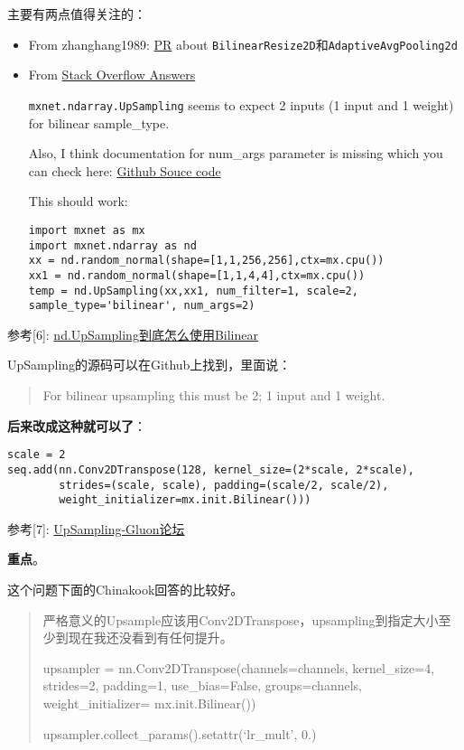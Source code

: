 主要有两点值得关注的：
\begin{itemize}
\item From zhanghang1989: \href{https://github.com/apache/incubator-mxnet/pull/9688}{PR} about \verb|BilinearResize2D|和\verb|AdaptiveAvgPooling2d|
\item From \href{https://stackoverflow.com/questions/47897924/implementing-bilinear-interpolation-with-mxnet-ndarray-upsampling}{Stack Overflow Answers}

\verb|mxnet.ndarray.UpSampling| seems to expect 2 inputs (1 input and 1 weight) for bilinear sample\_type.

Also, I think documentation for num\_args parameter is missing which you can check here: \href{https://github.com/apache/incubator-mxnet/blob/master/src/operator/nn/upsampling-inl.h#L78}{Github Souce code}

This should work:

\begin{lstlisting}
import mxnet as mx
import mxnet.ndarray as nd
xx = nd.random_normal(shape=[1,1,256,256],ctx=mx.cpu())
xx1 = nd.random_normal(shape=[1,1,4,4],ctx=mx.cpu()) 
temp = nd.UpSampling(xx,xx1, num_filter=1, scale=2, sample_type='bilinear', num_args=2)
\end{lstlisting}

\end{itemize}

参考[6]: \href{https://discuss.gluon.ai/t/topic/2823}{nd.UpSampling到底怎么使用Bilinear}

UpSampling的源码可以在Github上找到，里面说：

\begin{quote}
For bilinear upsampling this must be 2; 1 input and 1 weight.
\end{quote}
\textbf{后来改成这种就可以了}：
\begin{lstlisting}
scale = 2
seq.add(nn.Conv2DTranspose(128, kernel_size=(2*scale, 2*scale), 
		strides=(scale, scale), padding=(scale/2, scale/2), 
		weight_initializer=mx.init.Bilinear()))
\end{lstlisting}

参考[7]: \href{https://discuss.gluon.ai/t/topic/2672}{UpSampling-Gluon论坛}

\textbf{重点}。

这个问题下面的Chinakook回答的比较好。

\begin{quote}
严格意义的Upsample应该用Conv2DTranspose，upsampling到指定大小至少到现在我还没看到有任何提升。

upsampler = nn.Conv2DTranspose(channels=channels, 
		kernel\_size=4, strides=2, padding=1, use\_bias=False,
		groups=channels, weight\_initializer= mx.init.Bilinear()) 
		
upsampler.collect\_params().setattr(‘lr\_mult’, 0.)
\end{quote}

